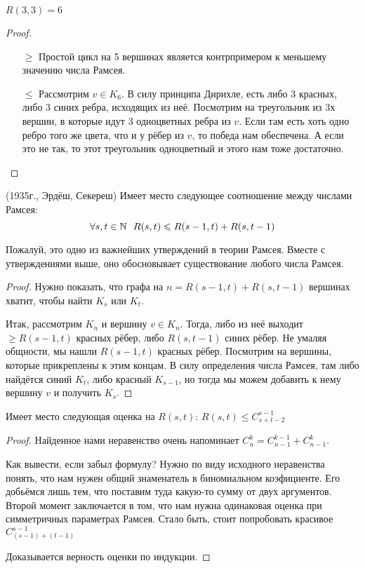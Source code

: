 \begin{proposition}
	$R(3, 3) = 6$
\end{proposition}

\begin{proof}~
	\begin{itemize}
		\item[$\ge$] Простой цикл на 5 вершинах является контрпримером к меньшему значению числа Рамсея.
		
		\item[$\le$] Рассмотрим $v \in K_6$. В силу принципа Дирихле, есть либо 3 красных, либо 3 синих ребра, исходящих из неё. Посмотрим на треугольник из 3х вершин, в которые идут 3 одноцветных ребра из $v$. Если там есть хоть одно ребро того же цвета, что и у рёбер из $v$, то победа нам обеспечена. А если это не так, то этот треугольник одноцветный и этого нам тоже достаточно.
	\end{itemize}
\end{proof}

\begin{theorem} (1935г., Эрдёш, Секереш)
	Имеет место следующее соотношение между числами Рамсея:
	\[
		\forall s, t \in \mathbb{N}\ \ R(s, t) \leqslant R(s - 1, t) + R(s, t - 1)
	\]
\end{theorem}

\begin{note}
	Пожалуй, это одно из важнейших утверждений в теории Рамсея. Вместе с утверждениями выше, оно обосновывает существование любого числа Рамсея.
\end{note}

\begin{proof}
	Нужно показать, что графа на $n = R(s - 1, t) + R(s, t - 1)$ вершинах хватит, чтобы найти $K_s$ или $K_t$.
	
	Итак, рассмотрим $K_n$ и вершину $v \in K_n$. Тогда, либо из неё выходит $\ge R(s - 1, t)$ красных рёбер, либо $R(s, t - 1)$ синих рёбер. Не умаляя общности, мы нашли $R(s - 1, t)$ красных рёбер. Посмотрим на вершины, которые прикреплены к этим концам. В силу определения числа Рамсея, там либо найдётся синий $K_t$, либо красный $K_{s - 1}$, но тогда мы можем добавить к нему вершину $v$ и получить $K_s$.
\end{proof}

\begin{proposition}
	Имеет место следующая оценка на $R(s, t)$: \(R(s, t) \le C_{s + t - 2}^{s - 1}\)
\end{proposition}

\begin{proof}
	Найденное нами неравенство очень напоминает $C_n^k = C_{n - 1}^{k - 1} + C_{n - 1}^k$.
	
	Как вывести, если забыл формулу? Нужно по виду исходного неравенства понять, что нам нужен общий знаменатель в биномиальном коэфициенте. Его добьёмся лишь тем, что поставим туда какую-то сумму от двух аргументов. Второй момент заключается в том, что нам нужна одинаковая оценка при симметричных параметрах Рамсея. Стало быть, стоит попробовать красивое $C_{(s - 1) + (t - 1)}^{s - 1}$
	
	Доказывается верность оценки по индукции.
\end{proof}

